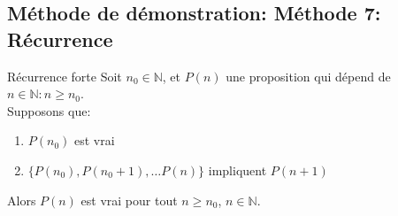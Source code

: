 \subsection{Méthode de démonstration: Méthode 7: Récurrence}
\begin{parag}{Récurrence forte}
    Soit $n_0 \in \mathbb{N}$, et $P\left(n\right)$ une proposition qui dépend de $n \in \mathbb{N}: n \geq n_0$.\\
    Supposons que:
    \begin{enumerate}
        \item $P\left(n_0\right)$ est vrai
        \item $\{P\left(n_0\right), P\left(n_0 + 1\right), \ldots P\left(n\right)\}$ impliquent $P\left(n+1\right)$
    \end{enumerate}
    Alors $P\left(n\right)$ est vrai pour tout $n \geq n_0$, $n \in \mathbb{N}$.
\end{parag}
